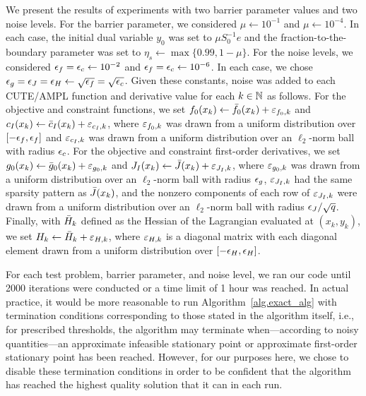 We present the results of experiments with two barrier parameter values and two noise levels.  For the barrier parameter, we considered $\mu \gets 10^{-1}$ and $\mu \gets 10^{-4}$.  In each case, the initial dual variable $y_0$ was set to $\mu S_0^{-1} e$ and the fraction-to-the-boundary parameter was set to $\eta_s \gets \max \{0.99, 1 - \mu \}$.  For the noise levels, we considered $\epsilon_f = \epsilon_c \gets 10^{-2}$ and $\epsilon_f = \epsilon_c \gets 10^{-6}$.  In each case, we chose $\epsilon_g = \epsilon_J = \epsilon_H \gets \sqrt{\epsilon_f} = \sqrt{\epsilon_c}$.  Given these constants, noise was added to each CUTE/AMPL function and derivative value for each $k \in \mathbb{N}$ as follows.  For the objective and constraint functions, we set $f_0(x_k) \gets {\bar f}_0(x_k) + \varepsilon_{f_0,k}$ and $c_I(x_k) \gets {\bar c}_I(x_k) + \varepsilon_{c_I,k}$, where $\varepsilon_{f_0,k}$ was drawn from a uniform distribution over $[-\epsilon_f,\epsilon_f]$ and $\varepsilon_{c_I,k}$ was drawn from a uniform distribution over an $\ell_2$-norm ball with radius $\epsilon_c$.  For the objective and constraint first-order derivatives, we set $g_0(x_k) \gets {\bar g}_0(x_k) + \varepsilon_{g_0,k}$ and $J_I(x_k) \gets {\bar J}(x_k) + \varepsilon_{J_I,k}$, where $\varepsilon_{g_0,k}$ was drawn from a uniform distribution over an $\ell_2$-norm ball with radius $\epsilon_g$, $\varepsilon_{J_I,k}$ had the same sparsity pattern as ${\bar J}(x_k)$, and the nonzero components of each row of $\varepsilon_{J_I,k}$ were drawn from a uniform distribution over an $\ell_2$-norm ball with radius $\epsilon_J/\sqrt{q}$.  Finally, with ${\bar H}_k$ defined as the Hessian of the Lagrangian evaluated at $(x_k,y_k)$, we set $H_k \gets {\bar H}_k + \varepsilon_{H,k}$, where $\varepsilon_{H,k}$ is a diagonal matrix with each diagonal element drawn from a uniform distribution over $[-\epsilon_H,\epsilon_H]$.

For each test problem, barrier parameter, and noise level, we ran our code until 2000 iterations were conducted or a time limit of 1 hour was reached.  In actual practice, it would be more reasonable to run Algorithm~\ref{alg.exact_alg} with termination conditions corresponding to those stated in the algorithm itself, i.e., for prescribed thresholds, the algorithm may terminate when---according to noisy quantities---an approximate infeasible stationary point or approximate first-order stationary point has been reached.  However, for our purposes here, we chose to disable these termination conditions in order to be confident that the algorithm has reached the highest quality solution that it can in each run.

